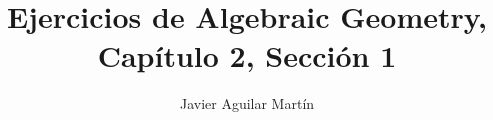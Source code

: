 \documentclass[twoside]{article}
\begin{document}
\title{Ejercicios de Algebraic Geometry, Capítulo 2, Sección 1}
\author{Javier Aguilar Martín}
\maketitle


%
%
%
%
%
%
%
%
%
%
%
\end{document}
